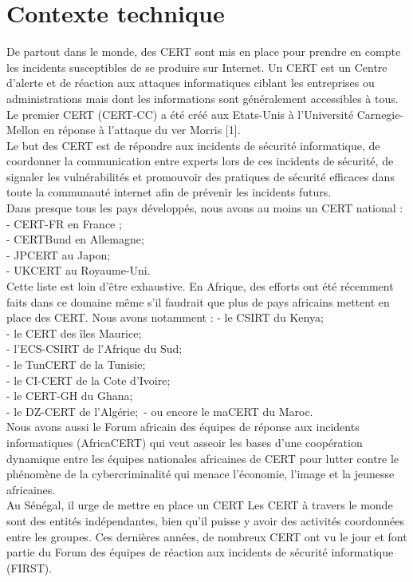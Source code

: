 \section{Contexte technique}
De partout dans le monde, des CERT sont mis en place pour prendre en compte les incidents susceptibles de se produire sur Internet. Un CERT est un Centre d’alerte et de réaction aux attaques informatiques ciblant les entreprises ou administrations mais dont les informations sont généralement accessibles à tous. Le premier CERT (CERT-CC) a été créé aux Etats-Unis à l’Université Carnegie-Mellon en réponse à l’attaque du ver Morris [1]. \\
Le but des CERT est de répondre aux incidents de sécurité informatique, de coordonner la communication entre experts lors de ces incidents de sécurité, de signaler les vulnérabilités et promouvoir des pratiques de sécurité efficaces dans toute la communauté internet afin de prévenir les incidents futurs. \\
Dans presque tous les pays développés, nous avons au moins un CERT national : \\
- CERT-FR en France ; \\
- CERTBund en Allemagne; \\ 
- JPCERT au Japon; \\
- UKCERT au Royaume-Uni.\\
Cette liste est loin d'être exhaustive.
En Afrique, des efforts ont été récemment faits  dans ce domaine même s’il faudrait que plus de pays africains mettent en place des CERT. Nous avons notamment :
- le CSIRT du Kenya;\\
- le CERT des îles Maurice;\\
- l’ECS-CSIRT de l’Afrique du Sud;\\
- le TunCERT de la Tunisie;\\
- le CI-CERT de la Cote d’Ivoire;\\
- le CERT-GH du Ghana;\\
- le DZ-CERT de l’Algérie;\
- ou encore le maCERT du Maroc. \\ 
Nous avons aussi le Forum africain des équipes de réponse aux incidents informatiques (AfricaCERT) qui veut asseoir les bases d’une coopération dynamique entre les équipes nationales africaines de CERT pour lutter contre le phénomène de la cybercriminalité qui menace l’économie, l’image et la jeunesse africaines.\\
Au Sénégal, il urge de mettre en place un CERT
Les CERT à travers le monde sont des entités indépendantes, bien qu'il puisse y avoir des activités coordonnées entre les groupes. Ces dernières années, de nombreux CERT ont vu le jour et font partie du Forum des équipes de réaction aux incidents de sécurité informatique (FIRST). \\

